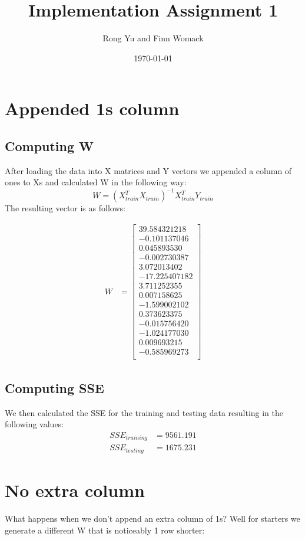 \documentclass{article}
\title{Implementation Assignment 1}
\date{\today}
\author{Rong Yu and Finn Womack}
\begin{document}
	\maketitle
	\section{Appended 1s column}
	\subsection{Computing W}
After loading the data into X matrices and Y vectors we appended a column of ones to Xs and calculated W in the following way:
	$$
	W = (X_{train}^{T}X_{train})^{-1}X_{train}^{T}Y_{train}
	$$
	The resulting vector is as follows:
	
	\begin{align}
		W &= \begin{bmatrix}
			39.584321218 \\
			-0.101137046 \\
			0.045893530 \\
			-0.002730387 \\
			3.072013402 \\
			-17.225407182 \\
			3.711252355 \\
			0.007158625 \\
			-1.599002102 \\
			0.373623375 \\
			-0.015756420 \\
			-1.024177030 \\
			0.009693215 \\
			-0.585969273 \\
		\end{bmatrix}
	\end{align}
	
	\subsection{Computing SSE}
	
We then calculated the SSE for the training and testing data resulting in the following values:
	\begin{align}
		SSE_{training} &= 9561.191 \\
		SSE_{testing} &= 1675.231
	\end{align}

	\section{No extra column}
What happens when we don't append an extra column of 1s? Well for starters we generate a different W that is noticeably 1 row shorter:
	
\end{document}
